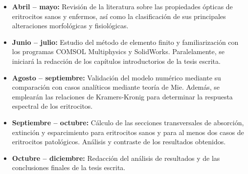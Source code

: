 \documentclass[11pt,letterpaper]{article}
\begin{document}
	\begin{itemize} 
		\item \textbf{Abril – mayo:} Revisión de la literatura sobre las propiedades ópticas de eritrocitos sanos y enfermos, así como la clasificación de sus principales alteraciones morfológicas y fisiológicas.
		\item \textbf{Junio – julio:} Estudio del método de elemento finito y familiarización con los programas COMSOL Multiphysics y SolidWorks. Paralelamente, se iniciará la redacción de los capítulos introductorios de la tesis escrita.
		
		\item \textbf{Agosto – septiembre:} Validación del modelo numérico mediante su comparación con casos analíticos mediante teoría de Mie. Además, se emplearán las relaciones de Kramers-Kronig para determinar la respuesta espectral de los eritrocitos. 
		
		\item \textbf{Septiembre – octubre:} Cálculo de las secciones transversales de absorción, extinción y esparcimiento para eritrocitos sanos y para al menos dos casos de eritrocitos patológicos. Análisis y contraste de los resultados obtenidos.
		
		\item \textbf{Octubre – diciembre:} Redacción del análisis de resultados y de las conclusiones finales de la tesis escrita.
	\end{itemize}
	
\end{document}
